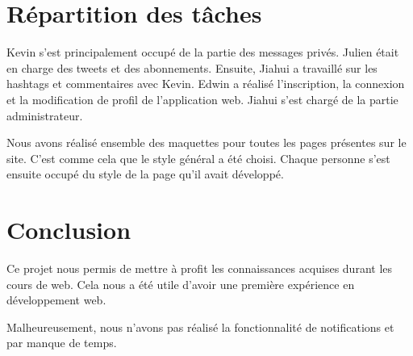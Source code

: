 \documentclass[a4paper, 12pt]{article}
\begin{document}
\section{Répartition des tâches}

Kevin s'est principalement occupé de la partie des messages privés. Julien était en charge des tweets et des abonnements. Ensuite, Jiahui a travaillé sur les hashtags et commentaires avec Kevin. Edwin a réalisé l'inscription, la connexion et la modification de profil de l'application web. Jiahui s'est chargé de la partie administrateur.

Nous avons réalisé ensemble des maquettes pour toutes les pages présentes sur le site. C'est comme cela que le style général a été choisi. Chaque personne s'est ensuite occupé du style de la page qu'il avait développé.

\section{Conclusion}		

Ce projet nous permis de mettre à profit les connaissances acquises durant les cours de web. Cela nous a été utile d'avoir une première expérience en développement web. 




Malheureusement, nous n'avons pas réalisé la fonctionnalité de notifications et par manque de temps. 
\end{document}
